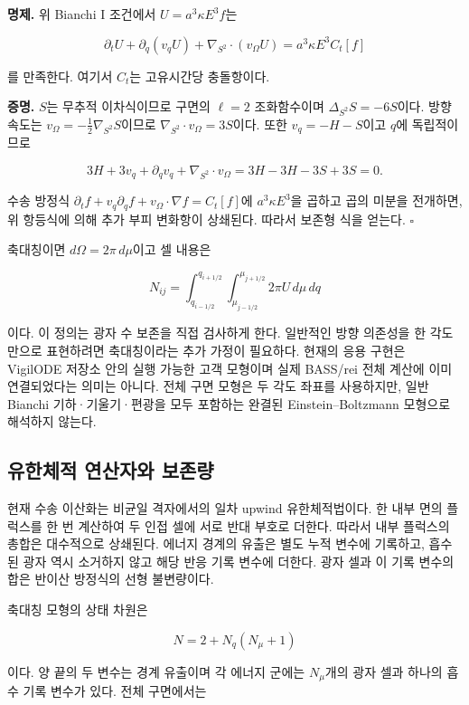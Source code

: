 \documentclass[
  10pt,
  a4paper,
]{article}
\begin{document}
\textbf{명제.} 위 Bianchi I 조건에서 \(U=a^3\kappa E^3f\)는

\[
\partial_tU+\partial_q(v_qU)+\nabla_{S^2}\cdot(v_\Omega U)
 =a^3\kappa E^3 C_t[f]
\]

를 만족한다. 여기서 \(C_t\)는 고유시간당 충돌항이다.

\textbf{증명.} \(S\)는 무추적 이차식이므로 구면의 \(\ell=2\)
조화함수이며 \(\Delta_{S^2}S=-6S\)이다. 방향 속도는
\(v_\Omega=-\frac12\nabla_{S^2}S\)이므로
\(\nabla_{S^2}\cdot v_\Omega=3S\)이다. 또한 \(v_q=-H-S\)이고 \(q\)에
독립적이므로

\[
3H+3v_q+\partial_qv_q+\nabla_{S^2}\cdot v_\Omega
 =3H-3H-3S+3S=0.
\]

수송 방정식
\(\partial_tf+v_q\partial_qf+v_\Omega\cdot\nabla f=C_t[f]\)에
\(a^3\kappa E^3\)을 곱하고 곱의 미분을 전개하면, 위 항등식에 의해 추가
부피 변화항이 상쇄된다. 따라서 보존형 식을 얻는다. \(\square\)

축대칭이면 \(d\Omega=2\pi\,d\mu\)이고 셀 내용은

\[
N_{ij}=\int_{q_{i-1/2}}^{q_{i+1/2}}
       \int_{\mu_{j-1/2}}^{\mu_{j+1/2}}2\pi U\,d\mu\,dq
\]

이다. 이 정의는 광자 수 보존을 직접 검사하게 한다. 일반적인 방향
의존성을 한 각도만으로 표현하려면 축대칭이라는 추가 가정이 필요하다.
현재의 응용 구현은 VigilODE 저장소 안의 실행 가능한 고객 모형이며 실제
BASS/rei 전체 계산에 이미 연결되었다는 의미는 아니다. 전체 구면 모형은
두 각도 좌표를 사용하지만, 일반 Bianchi 기하·기울기·편광을 모두 포함하는
완결된 Einstein--Boltzmann 모형으로 해석하지 않는다.

\hypertarget{uxc720uxd55cuxccb4uxc801-uxc5f0uxc0b0uxc790uxc640-uxbcf4uxc874uxb7c9}{%
\subsection{유한체적 연산자와
보존량}\label{uxc720uxd55cuxccb4uxc801-uxc5f0uxc0b0uxc790uxc640-uxbcf4uxc874uxb7c9}}

현재 수송 이산화는 비균일 격자에서의 일차 upwind 유한체적법이다. 한 내부
면의 플럭스를 한 번 계산하여 두 인접 셀에 서로 반대 부호로 더한다.
따라서 내부 플럭스의 총합은 대수적으로 상쇄된다. 에너지 경계의 유출은
별도 누적 변수에 기록하고, 흡수된 광자 역시 소거하지 않고 해당 반응 기록
변수에 더한다. 광자 셀과 이 기록 변수의 합은 반이산 방정식의 선형
불변량이다.

축대칭 모형의 상태 차원은

\[
N=2+N_q(N_\mu+1)
\]

이다. 양 끝의 두 변수는 경계 유출이며 각 에너지 군에는 \(N_\mu\)개의
광자 셀과 하나의 흡수 기록 변수가 있다. 전체 구면에서는
\end{document}
